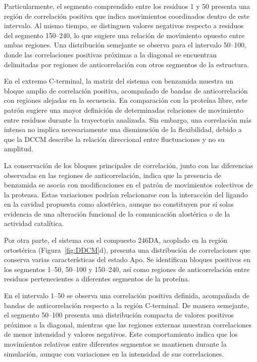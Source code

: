 Particularmente, el segmento comprendido entre los residuos 1 y 50 presenta una región de correlación positiva que indica movimientos coordinados dentro de este intervalo. Al mismo tiempo, se distinguen valores negativos respecto a residuos del segmento 150--240, lo que sugiere una relación de movimiento opuesto entre ambas regiones. Una distribución semejante se observa para el intervalo 50--100, donde las correlaciones positivas próximas a la diagonal se encuentran delimitadas por regiones de anticorrelación con otros segmentos de la estructura.

En el extremo C-terminal, la matriz del sistema con benzamida muestra un bloque amplio de correlación positiva, acompañado de bandas de anticorrelación con regiones alejadas en la secuencia. En comparación con la proteína libre, este patrón sugiere una mayor definición de determinadas relaciones de movimiento entre residuos durante la trayectoria analizada. Sin embargo, una correlación más intensa no implica necesariamente una disminución de la flexibilidad, debido a que la DCCM describe la relación direccional entre fluctuaciones y no su amplitud.

La conservación de los bloques principales de correlación, junto con las diferencias observadas en las regiones de anticorrelación, indica que la presencia de benzamida se asocia con modificaciones en el patrón de movimientos colectivos de la proteasa. Estas variaciones podrían relacionarse con la interacción del ligando en la cavidad propuesta como alostérica, aunque no constituyen por sí solas evidencia de una alteración funcional de la comunicación alostérica o de la actividad catalítica.

Por otra parte, el sistema con el compuesto 246DA, acoplado en la región ortostérica (Figura~\ref{fig:DDCM}d), presenta una distribución de correlaciones que conserva varias características del estado Apo. Se identifican bloques positivos en los segmentos 1--50, 50--100 y 150--240, así como regiones de anticorrelación entre residuos pertenecientes a diferentes segmentos de la proteína.

En el intervalo 1--50 se observa una correlación positiva definida, acompañada de bandas de anticorrelación respecto a la región C-terminal. De manera semejante, el segmento 50--100 presenta una distribución compacta de valores positivos próximos a la diagonal, mientras que las regiones externas muestran correlaciones de menor intensidad y valores negativos. Este comportamiento indica que los movimientos relativos entre diferentes segmentos se mantienen durante la simulación, aunque con variaciones en la intensidad de sus correlaciones.

